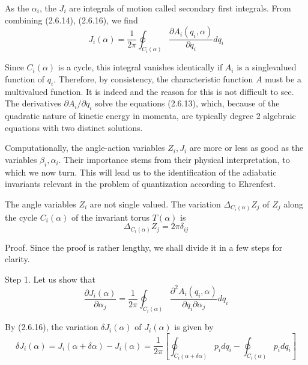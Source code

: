 \documentclass{article}
\begin{document}
As the $\alpha_{i}$, the $J_{i}$ are integrals of motion called secondary first integrals.
From combining (2.6.14), (2.6.16), we find
$$
\begin{equation*}
J_{i}(\alpha)=\frac{1}{2 \pi} \oint_{C_{i}(\alpha)} \frac{\partial A_{i}\left(q_{i}, \alpha\right)}{\partial q_{i}} d q_{i} \tag{2.6.22}
\end{equation*}
$$

Since $C_{i}(\alpha)$ is a cycle, this integral vanishes identically if $A_{i}$ is a singlevalued function of $q_{i}$. Therefore, by consistency, the characteristic function $A$ must be a multivalued function. It is indeed and the reason for this is not difficult to see. The derivatives $\partial A_{i} / \partial q_{i}$ solve the equations (2.6.13), which, because of the quadratic nature of kinetic energy in momenta, are typically degree 2 algebraic equations with two distinct solutions.

Computationally, the angle-action variables $Z_{i}, J_{i}$ are more or less as good as the variables $\beta_{i}, \alpha_{i}$. Their importance stems from their physical interpretation, to which we now turn. This will lead us to the identification of the adiabatic invariants relevant in the problem of quantization according to Ehrenfest.

The angle variables $Z_{i}$ are not single valued. The variation $\Delta_{C_{i}(\alpha)} Z_{j}$ of $Z_{j}$ along the cycle $C_{i}(\alpha)$ of the invariant torus $T(\alpha)$ is
$$
\begin{equation*}
\Delta_{C_{i}(\alpha)} Z_{j}=2 \pi \delta_{i j} \tag{2.6.23}
\end{equation*}
$$

Proof. Since the proof is rather lengthy, we shall divide it in a few steps for clarity.

Step 1. Let us show that
$$
\begin{equation*}
\frac{\partial J_{i}(\alpha)}{\partial \alpha_{j}}=\frac{1}{2 \pi} \oint_{C_{i}(\alpha)} \frac{\partial^{2} A_{i}\left(q_{i}, \alpha\right)}{\partial q_{i} \partial \alpha_{j}} d q_{i} \tag{2.6.24}
\end{equation*}
$$

By (2.6.16), the variation $\delta J_{i}(\alpha)$ of $J_{i}(\alpha)$ is given by
$$
\begin{equation*}
\delta J_{i}(\alpha)=J_{i}(\alpha+\delta \alpha)-J_{i}(\alpha)=\frac{1}{2 \pi}\left[\oint_{C_{i}(\alpha+\delta \alpha)} p_{i} d q_{i}-\oint_{C_{i}(\alpha)} p_{i} d q_{i}\right] \tag{2.6.25}
\end{equation*}
$$
\end{document}
